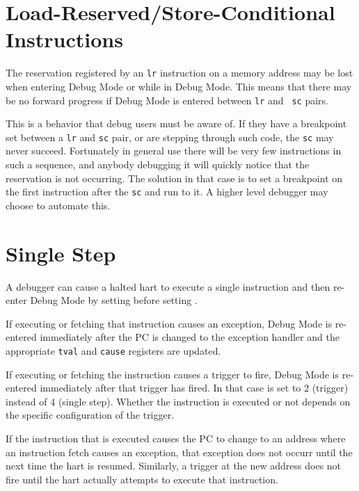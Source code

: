 \section{Load-Reserved/Store-Conditional Instructions}

The reservation registered by an {\tt lr} instruction on a memory address may
be lost when entering Debug Mode or while in Debug Mode.  This means that there
may be no forward progress if Debug Mode is entered between {\tt lr} and {\tt
sc} pairs.

\begin{commentary}
    This is a behavior that debug users must be aware of. If they have a
    breakpoint set between a {\tt lr} and {\tt sc} pair, or are stepping
    through such code, the {\tt sc} may never succeed.  Fortunately in general use
    there will be very few instructions in such a sequence, and anybody
    debugging it will quickly notice that the reservation is not occurring.
    The solution in that case is to set a breakpoint on the first instruction
    after the {\tt sc} and run to it. A higher level debugger may choose to
    automate this.
\end{commentary}

\section{Single Step}

A debugger can cause a halted hart to execute a single instruction and then
re-enter Debug Mode by setting \Fstep before setting \Fresumereq.

If executing or fetching that instruction causes an exception, Debug Mode is
re-entered immediately after the PC is changed to the exception handler and the
appropriate {\tt tval} and {\tt cause} registers are updated.

If executing or fetching the instruction causes a trigger to fire, Debug Mode
is re-entered immediately after that trigger has fired. In that case \Fcause is
set to 2 (trigger) instead of 4 (single step).  Whether the instruction is
executed or not depends on the specific configuration of the trigger.

If the instruction that is executed causes the PC to change to an address where
an instruction fetch causes an exception, that exception does not occurr until
the next time the hart is resumed. Similarly, a trigger at the new address does
not fire until the hart actually attempts to execute that instruction.

